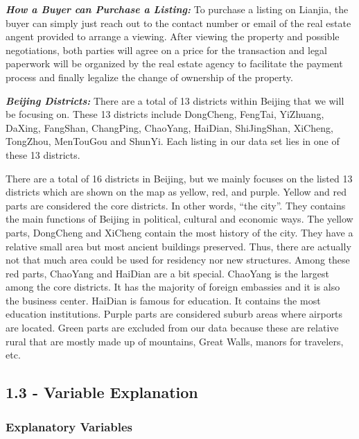 \documentclass[
]{article}
\begin{document}
\textbf{\emph{How a Buyer can Purchase a Listing:}} To purchase a
listing on Lianjia, the buyer can simply just reach out to the contact
number or email of the real estate angent provided to arrange a viewing.
After viewing the property and possible negotiations, both parties will
agree on a price for the transaction and legal paperwork will be
organized by the real estate agency to facilitate the payment process
and finally legalize the change of ownership of the property.

\textbf{\emph{Beijing Districts:}} There are a total of 13 districts
within Beijing that we will be focusing on. These 13 districts include
DongCheng, FengTai, YiZhuang, DaXing, FangShan, ChangPing, ChaoYang,
HaiDian, ShiJingShan, XiCheng, TongZhou, MenTouGou and ShunYi. Each
listing in our data set lies in one of these 13 districts.

There are a total of 16 districts in Beijing, but we mainly focuses on
the listed 13 districts which are shown on the map as yellow, red, and
purple. Yellow and red parts are considered the core districts. In other
words, ``the city''. They contains the main functions of Beijing in
political, cultural and economic ways. The yellow parts, DongCheng and
XiCheng contain the most history of the city. They have a relative small
area but most ancient buildings preserved. Thus, there are actually not
that much area could be used for residency nor new structures. Among
these red parts, ChaoYang and HaiDian are a bit special. ChaoYang is the
largest among the core districts. It has the majority of foreign
embassies and it is also the business center. HaiDian is famous for
education. It contains the most education institutions. Purple parts are
considered suburb areas where airports are located. Green parts are
excluded from our data because these are relative rural that are mostly
made up of mountains, Great Walls, manors for travelers, etc.

\hypertarget{variable-explanation}{%
\subsection{\texorpdfstring{\textbf{1.3 - Variable
Explanation}}{1.3 - Variable Explanation}}\label{variable-explanation}}

\hypertarget{explanatory-variables}{%
\subsubsection{\texorpdfstring{\textbf{Explanatory
Variables}}{Explanatory Variables}}\label{explanatory-variables}}
\end{document}
